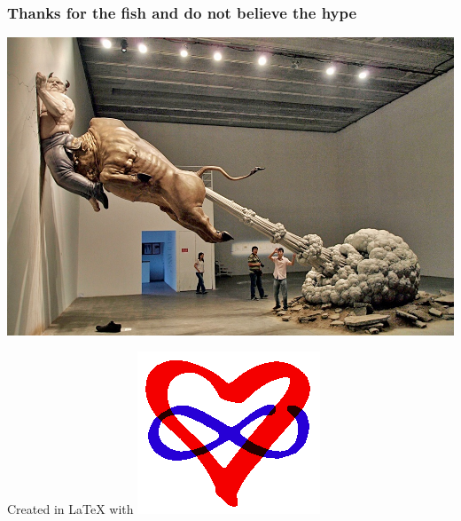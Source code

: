 \documentclass[a4paper]{beamer}
\begin{document}
\begin{frame}
	\frametitle{Thanks for the fish and do not believe the hype}
	\begin{center}
		\includegraphics[scale=1.00]{img/bullshit-sculpture.jpg}
	\end{center}
	Created in \LaTeX{} with \includegraphics[scale=0.05]{img/polyamory.png}
\end{frame}
\end{document}
